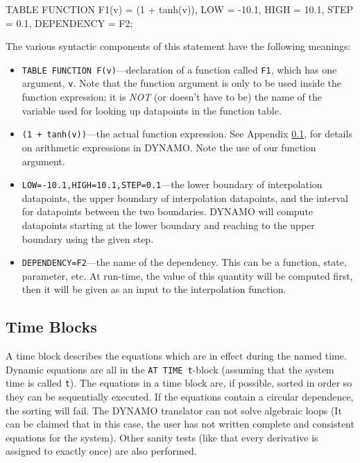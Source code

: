 \begin{example}
        TABLE FUNCTION F1(v) = (1 + tanh(v)), 
                       LOW = -10.1, HIGH = 10.1, STEP = 0.1, 
                       DEPENDENCY = F2;
\end{example}

The various syntactic components of this statement have the following
meanings: 
\begin{itemize}
\item \texttt{TABLE FUNCTION F(v)}---declaration of a function called \texttt{F1}, which has one argument, \texttt{v}. Note that the function argument is only to be used inside the function expression; it is \emph{NOT} (or doesn't have to be) the name of the variable used for looking up datapoints in the function table.
\item \texttt{(1 + tanh(v))}---the actual function expression. See Appendix \ref{DYNAMOtimeblock}, for details on arithmetic expressions in DYNAMO. Note the use of our function argument.
\item \texttt{LOW=-10.1,HIGH=10.1,STEP=0.1}---the lower boundary of interpolation datapoints, the upper boundary of interpolation datapoints, and the interval for datapoints between the two boundaries. DYNAMO will compute datapoints starting at the lower boundary and reaching to the upper boundary using the given step.
\item \texttt{DEPENDENCY=F2}---the name of the dependency. This can be a function, state, parameter, etc. At run-time, the value of this quantity will be computed first, then it will be given as an input to the interpolation function.
\end{itemize}

\subsection{Time Blocks}
\label{DYNAMOtimeblock}

A time block describes the equations which are in effect during the
named time. Dynamic equations are all in the \texttt{AT TIME t}-block
(assuming that the system time is called \texttt{t}).  The equations in
a time block are, if possible, sorted in order so they can be
sequentially executed. If the equations contain a circular dependence,
the sorting will fail. The DYNAMO translator can not solve algebraic
loops (It can be claimed that in this case, the user has not written
complete and consistent equations for the system). Other sanity tests
(like that every derivative is assigned to exactly once) are also
performed.

